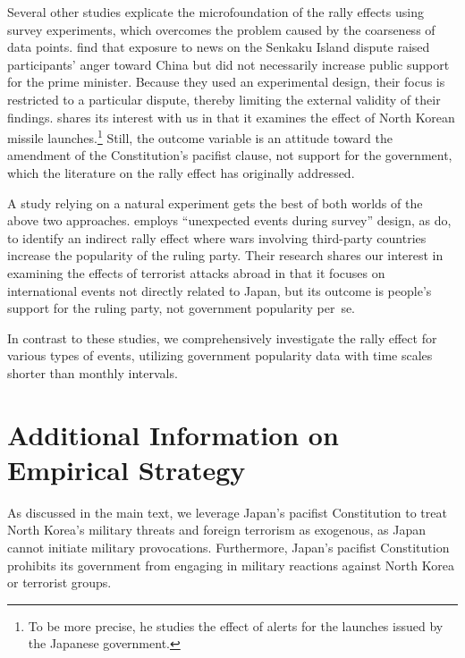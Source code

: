 \documentclass[12pt,letterpaper]{scrartcl}
\let\oldfootnote\footnote
\renewcommand\footnote[1]{\oldfootnote{\hspace{2mm}#1}}
\begin{document}
Several other studies explicate the microfoundation of the rally effects using survey experiments, which overcomes the problem caused by the coarseness of data points. \citet{kobayashi2018} find that exposure to news on the Senkaku Island dispute raised participants' anger toward China but did not necessarily increase public support for the prime minister. Because they used an experimental design, their focus is restricted to a particular dispute, thereby limiting the external validity of their findings. \citet{Hata2023} shares its interest with us in that it examines the effect of North Korean missile launches.\footnote{To be more precise, he studies the effect of alerts for the launches issued by the Japanese government.} Still, the outcome variable is an attitude toward the amendment of the Constitution's pacifist clause, not support for the government, which the literature on the rally effect has originally addressed.

A study relying on a natural experiment gets the best of both worlds of the above two approaches. \citet{fukumoto2023} employs ``unexpected events during survey'' design, as \citet{seo2023} do, to identify an indirect rally effect where wars involving third-party countries increase the popularity of the ruling party. Their research shares our interest in examining the effects of terrorist attacks abroad in that it focuses on international events not directly related to Japan, but its outcome is people's support for the ruling party, not government popularity per~se.

In contrast to these studies, we comprehensively investigate the rally effect for various types of events, utilizing government popularity data with time scales shorter than monthly intervals.

\section{Additional Information on Empirical Strategy}\label{app:sec:japan}

As discussed in the main text, we leverage Japan's pacifist Constitution to treat North Korea's military threats and foreign terrorism as exogenous, as Japan cannot initiate military provocations. Furthermore, Japan's pacifist Constitution prohibits its government from engaging in military reactions against North Korea or terrorist groups.
\end{document}
